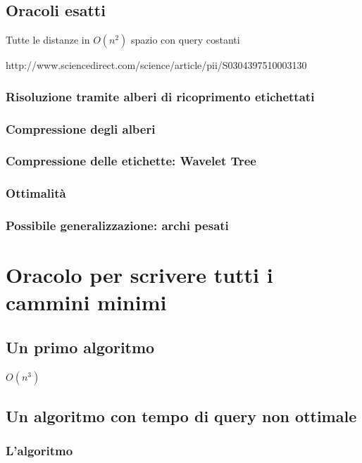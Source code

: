 \documentclass[a4paper,10pt]{amsbook}
\theoremstyle{plain}
\theoremstyle{definition}
\theoremstyle{remark}
\begin{document}
\section{Oracoli esatti}
\label{sec:oracoliesatti}

Tutte le distanze in $O(n^2)$ spazio con query costanti

http://www.sciencedirect.com/science/article/pii/S0304397510003130

\subsection{Risoluzione tramite alberi di ricoprimento etichettati}

\subsection{Compressione degli alberi}

\subsection{Compressione delle etichette: Wavelet Tree}

\subsection{Ottimalità}

\subsection{Possibile generalizzazione: archi pesati}


\chapter{Oracolo per scrivere tutti i cammini minimi}
\label{chap:oracolotutticammini}

\section{Un primo algoritmo}

$O(n^3)$

\section{Un algoritmo con tempo di query non ottimale}

\subsection{L'algoritmo}
\end{document}
